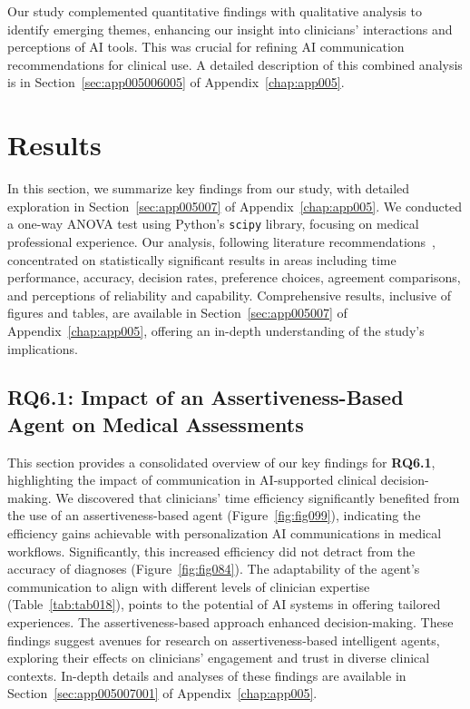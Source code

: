 \textcolor{revised}{Our study complemented quantitative findings with qualitative analysis to identify emerging themes, enhancing our insight into clinicians' interactions and perceptions of \ac{AI} tools.
This was crucial for refining \ac{AI} communication recommendations for clinical use.
A detailed description of this combined analysis is in Section~\ref{sec:app005006005} of Appendix~\ref{chap:app005}.}

\section{Results}
\label{sec:chap006006}

\textcolor{revised}{In this section, we summarize key findings from our study, with detailed exploration in Section~\ref{sec:app005007} of Appendix~\ref{chap:app005}.
We conducted a one-way \ac{ANOVA} test using Python's \texttt{scipy} library, focusing on medical professional experience.
Our analysis, following literature recommendations~\cite{CASALE2022107302}, concentrated on statistically significant results in areas including time performance, accuracy, decision rates, preference choices, agreement comparisons, and perceptions of reliability and capability.
Comprehensive results, inclusive of figures and tables, are available in Section~\ref{sec:app005007} of Appendix~\ref{chap:app005}, offering an in-depth understanding of the study's implications.}

\subsection{RQ6.1: Impact of an Assertiveness-Based Agent on Medical Assessments}
\label{sec:chap006006001}

\textcolor{revised}{This section provides a consolidated overview of our key findings for {\bf RQ6.1}, highlighting the impact of communication in \acs{AI}-supported clinical decision-making.
We discovered that clinicians' time efficiency significantly benefited from the use of an assertiveness-based agent (Figure~\ref{fig:fig099}), indicating the efficiency gains achievable with personalization \ac{AI} communications in medical workflows.
Significantly, this increased efficiency did not detract from the accuracy of diagnoses (Figure~\ref{fig:fig084}).
The adaptability of the agent's communication to align with different levels of clinician expertise (Table~\ref{tab:tab018}), points to the potential of \ac{AI} systems in offering tailored experiences.
The assertiveness-based approach enhanced decision-making.
These findings suggest avenues for research on assertiveness-based intelligent agents, exploring their effects on clinicians' engagement and trust in diverse clinical contexts.
In-depth details and analyses of these findings are available in Section~\ref{sec:app005007001} of Appendix~\ref{chap:app005}.}

